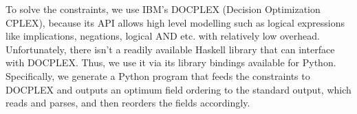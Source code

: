 To solve the constraints, we use IBM's DOCPLEX (Decision Optimization CPLEX),
because its API allows high level modelling such as logical expressions like implications, negations, logical AND etc. with relatively low overhead. 
%
Unfortunately, there isn't a readily available Haskell library that can interface with DOCPLEX.
%
Thus, we use it via its library bindings available for Python.
%
Specifically, we generate a Python program that feeds the constraints to DOCPLEX and
outputs an optimum field ordering to the standard output,
which \system{} reads and parses, and then reorders the fields accordingly.
%







